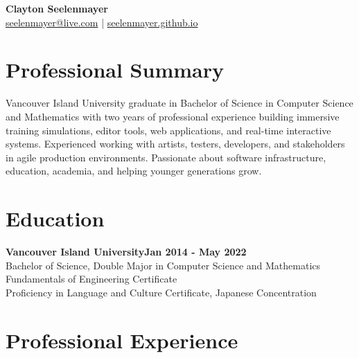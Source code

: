 \documentclass[10pt]{article}
\begin{document}

\begin{center}
	{\LARGE\textbf{Clayton Seelenmayer}}\\[3pt]
	\href{mailto:seelenmayer@live.com}{seelenmayer@live.com}
	\quad|\quad
	\href{https://seelenmayer.github.io}{seelenmayer.github.io}
\end{center}

\vspace{-4pt}

\section*{Professional Summary}

Vancouver Island University graduate in Bachelor of Science in Computer Science and Mathematics with two years of professional experience building immersive training simulations, editor tools, web applications, and real-time interactive systems. Experienced working with artists, testers, developers, and stakeholders in agile production environments. Passionate about software infrastructure, education, academia, and helping younger generations grow.

\section*{Education}

\textbf{Vancouver Island University}\hfill \textbf{Jan 2014 - May 2022}\\
Bachelor of Science, Double Major in Computer Science and Mathematics\\
Fundamentals of Engineering Certificate\\
Proficiency in Language and Culture Certificate, Japanese Concentration

\section*{Professional Experience}
\end{document}
